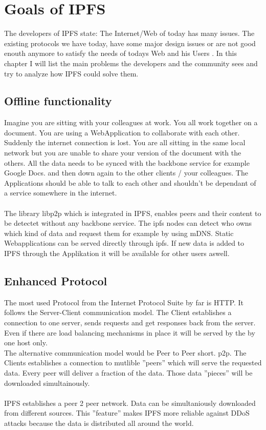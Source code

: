 \documentclass[a4paper,11pt, oneside]{report}
\theoremstyle{definition}
\begin{document}
\chapter{Goals of IPFS}
The developers of IPFS  state: The Internet/Web of today has many issues.  The existing protocols we have today, have some major design issues or are not good enouth anymore to satisfy the needs of todays Web and his Users \cite{TodaysProblems}. In this chapter I will list the main problems the developers and the community sees and try to analyze how IPFS could solve them.

\section{Offline functionality}
Imagine you are sitting with your colleagues at work. You all work together on a document. You are using a WebApplication to collaborate with each other. Suddenly the internet connection is lost. You are all sitting in the same local network but you are unable to share your version of the document with the others. All the data needs to be synced with the backbone service for example Google Docs. and then down again to the other clients / your colleagues. The Applications should be able to talk to each other and shouldn't be dependant of a service somewhere in the internet.\\ \\
The library libp2p which is integrated in IPFS, enables peers and their content to be detectet without any backbone service. The ipfs nodes can detect who owns which kind of data and request them for example by using mDNS. Static Webapplications can be served directly through ipfs. If new data is added to IPFS through the Applikation it will be available for other users aswell.

\section{Enhanced Protocol}
The most used Protocol from the Internet Protocol Suite by far is HTTP. It follows the Server-Client communication model. The Client establishes a connection to one server, sends requests and get responses back from the server. Even if there are load balancing mechanisms in place it will be served by the by one host only.\\[0.3cm]
The alternative communication model would be Peer to Peer short. p2p. The Clients establishes a connection to mutlible ''peers'' which will serve the requested data. Every peer will deliver a fraction of the data. Those data ''pieces'' will be downloaded simultainously.\\ \\
IPFS establishes a peer 2 peer network. Data can be simultaniously downloaded from different sources. This ''feature'' makes IPFS more reliable against DDoS attacks because the data is distributed all around the world.
\end{document}
